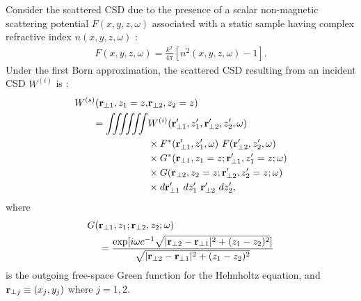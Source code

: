 \documentclass[%
 reprint,
 amsmath,amssymb,
 aps,
]{revtex4-1}
\begin{document}
Consider the scattered CSD due to the presence of a scalar non-magnetic scattering potential $F(x,y,z,\omega)$ associated with a static sample having complex refractive index $n(x,y,z,\omega)$ \cite{mandel_wolf}:
\begin{equation}
\begin{aligned}
\label{eq:ScatteringPotential}
F(x,y,z,\omega)=\frac{k^2}{4\pi}[n^2(x,y,z,\omega)-1].
\end{aligned}
\end{equation}
Under the first Born approximation, the scattered CSD resulting from an incident CSD $W^{(i)}$ is \cite{wolf_thin_book}:
\begin{equation}
\begin{aligned}
W^{(s)} ({\bf r}_{\perp 1}, z_1=z, & {\bf r}_{\perp 2},z_2=z) \\ 
=  \int \!\!\! \int \!\!\! \int \!\!\! \int \!\!\! \int \!\!\! \int &  W^{(i)}({\bf r}_{\perp 1}',z_1',{\bf r}_{\perp 2}',z_2',\omega)
\\ &\times F^*({\bf r}_{\perp 1}',z_1',\omega)~F({\bf r}_{\perp 2}',z_2',\omega) \\ &\times G^*({\bf r}_{\perp 1},z_1=z;{\bf r}_{\perp 1}',z'_1=z;\omega) \\ &\times G({\bf r}_{\perp 2},z_2=z;{\bf r}_{\perp 2}',z'_2=z;\omega) \\ &\times d{\bf r}_{\perp 1}'~dz'_1~{\bf r}_{\perp 2}'~dz'_2,
\label{eq:CSDScatteringFirstBornApproximation}
\end{aligned}
\end{equation}
where
\begin{equation}
\begin{aligned}
G( & {\bf r}_{\perp 1},z_1; {\bf r}_{\perp 2},z_2;\omega) \\ &=\frac{\exp[i \omega c^{-1}\sqrt{ | {\bf r}_{\perp 2}-{\bf r}_{\perp 1}|^2+(z_1-z_2)^2}]}{\sqrt{| {\bf r}_{\perp 2}-{\bf r}_{\perp 1}|^2+(z_1-z_2)^2}}
\end{aligned}
\end{equation}
is the outgoing free-space Green function for the Helmholtz equation, and  ${\bf r}_{\perp j}\equiv(x_j,y_j)$ where $j=1,2$.
\end{document}
